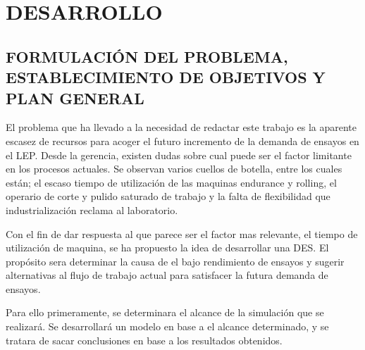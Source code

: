 
\section{DESARROLLO}

\subsection{FORMULACIÓN DEL PROBLEMA, \newline ESTABLECIMIENTO DE OBJETIVOS Y PLAN \newline GENERAL}

El problema que ha llevado a la necesidad de redactar este trabajo
es la aparente escasez de recursos para acoger
el futuro incremento de la demanda de ensayos en el LEP.
Desde la gerencia, existen dudas sobre cual puede ser el factor limitante
en los procesos actuales.
Se observan varios cuellos de botella,
entre los cuales están;
el escaso tiempo de utilización de las maquinas endurance y rolling,
el operario de corte y pulido saturado de trabajo
y la falta de flexibilidad que industrialización reclama al laboratorio.

Con el fin de dar respuesta al que parece ser el factor mas relevante,
el tiempo de utilización de maquina,
se ha propuesto la idea de desarrollar una DES.
El propósito sera determinar la causa de el bajo rendimiento de ensayos
y sugerir alternativas al flujo de trabajo actual
para satisfacer la futura demanda de ensayos.

Para ello primeramente,
se determinara el alcance de la simulación que se realizará.
Se desarrollará un modelo en base a el alcance determinado,
y se tratara de sacar conclusiones en base a los resultados obtenidos.

